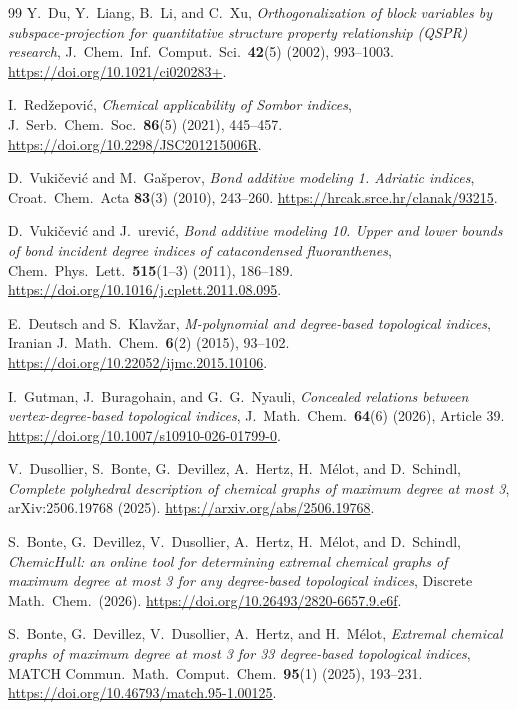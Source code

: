 \documentclass[11pt,a4paper]{article}
\theoremstyle{definition}
\begin{document}
\begin{thebibliography}{99}
Y.~Du, Y.~Liang, B.~Li, and C.~Xu,
\emph{Orthogonalization of block variables by subspace-projection for quantitative structure property relationship (QSPR) research},
J.~Chem.~Inf.~Comput.~Sci.~\textbf{42}(5) (2002), 993--1003.
\url{https://doi.org/10.1021/ci020283+}.

I.~Red\v{z}epovi\'c,
\emph{Chemical applicability of {Sombor} indices},
J.~Serb.~Chem.~Soc.~\textbf{86}(5) (2021), 445--457.
\url{https://doi.org/10.2298/JSC201215006R}.

D.~Vuki\v{c}evi\'c and M.~Ga\v{s}perov,
\emph{Bond additive modeling 1. Adriatic indices},
Croat.~Chem.~Acta \textbf{83}(3) (2010), 243--260.
\url{https://hrcak.srce.hr/clanak/93215}.

D.~Vuki\v{c}evi\'c and J.~\DJ ur\dj evi\'c,
\emph{Bond additive modeling 10. Upper and lower bounds of bond incident degree indices of catacondensed fluoranthenes},
Chem.~Phys.~Lett.~\textbf{515}(1--3) (2011), 186--189.
\url{https://doi.org/10.1016/j.cplett.2011.08.095}.

E.~Deutsch and S.~Klav\v{z}ar,
\emph{M-polynomial and degree-based topological indices},
Iranian J.~Math.~Chem.~\textbf{6}(2) (2015), 93--102.
\url{https://doi.org/10.22052/ijmc.2015.10106}.

I.~Gutman, J.~Buragohain, and G.~G.~Nyauli,
\emph{Concealed relations between vertex-degree-based topological indices},
J.~Math.~Chem.~\textbf{64}(6) (2026), Article 39.
\url{https://doi.org/10.1007/s10910-026-01799-0}.

V.~Dusollier, S.~Bonte, G.~Devillez, A.~Hertz, H.~M\'elot, and D.~Schindl,
\emph{Complete polyhedral description of chemical graphs of maximum degree at most 3},
arXiv:2506.19768 (2025).
\url{https://arxiv.org/abs/2506.19768}.

S.~Bonte, G.~Devillez, V.~Dusollier, A.~Hertz, H.~M\'elot, and D.~Schindl,
\emph{ChemicHull: an online tool for determining extremal chemical graphs of maximum degree at most 3 for any degree-based topological indices},
Discrete Math.~Chem.~(2026).
\url{https://doi.org/10.26493/2820-6657.9.e6f}.

S.~Bonte, G.~Devillez, V.~Dusollier, A.~Hertz, and H.~M\'elot,
\emph{Extremal chemical graphs of maximum degree at most 3 for 33 degree-based topological indices},
MATCH Commun.~Math.~Comput.~Chem.~\textbf{95}(1) (2025), 193--231.
\url{https://doi.org/10.46793/match.95-1.00125}.


\end{thebibliography}
\end{document}
